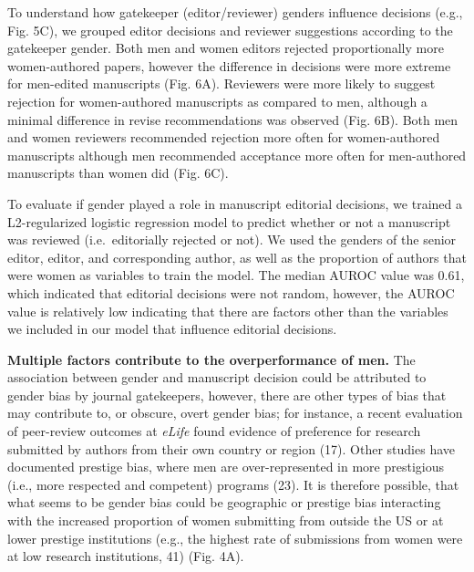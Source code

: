\documentclass[11pt,]{article}
\begin{document}
To understand how gatekeeper (editor/reviewer) genders influence
decisions (e.g., Fig. 5C), we grouped editor decisions and reviewer
suggestions according to the gatekeeper gender. Both men and women
editors rejected proportionally more women-authored papers, however the
difference in decisions were more extreme for men-edited manuscripts
(Fig. 6A). Reviewers were more likely to suggest rejection for
women-authored manuscripts as compared to men, although a minimal
difference in revise recommendations was observed (Fig. 6B). Both men
and women reviewers recommended rejection more often for women-authored
manuscripts although men recommended acceptance more often for
men-authored manuscripts than women did (Fig. 6C).

To evaluate if gender played a role in manuscript editorial decisions,
we trained a L2-regularized logistic regression model to predict whether
or not a manuscript was reviewed (i.e.~editorially rejected or not). We
used the genders of the senior editor, editor, and corresponding author,
as well as the proportion of authors that were women as variables to
train the model. The median AUROC value was 0.61, which indicated that
editorial decisions were not random, however, the AUROC value is
relatively low indicating that there are factors other than the
variables we included in our model that influence editorial decisions.

\textbf{Multiple factors contribute to the overperformance of men.} The
association between gender and manuscript decision could be attributed
to gender bias by journal gatekeepers, however, there are other types of
bias that may contribute to, or obscure, overt gender bias; for
instance, a recent evaluation of peer-review outcomes at \emph{eLife}
found evidence of preference for research submitted by authors from
their own country or region (17). Other studies have documented prestige
bias, where men are over-represented in more prestigious (i.e., more
respected and competent) programs (23). It is therefore possible, that
what seems to be gender bias could be geographic or prestige bias
interacting with the increased proportion of women submitting from
outside the US or at lower prestige institutions (e.g., the highest rate
of submissions from women were at low research institutions, 41) (Fig.
4A).
\end{document}
